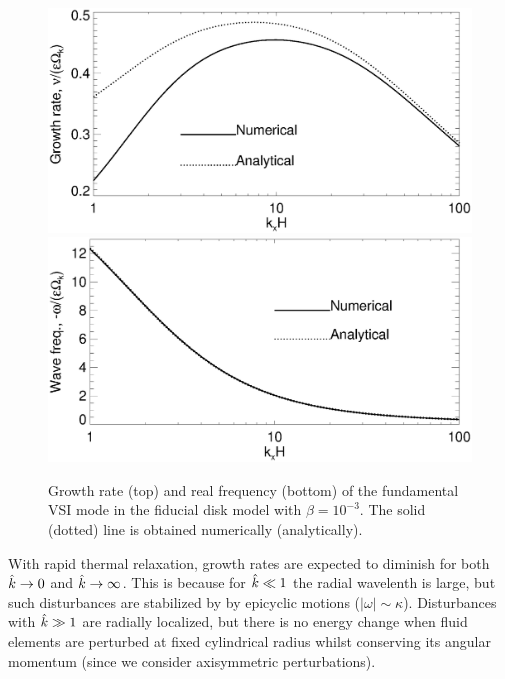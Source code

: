 \begin{figure}
  \includegraphics[width=\linewidth,clip=true,trim=0cm 1.75cm 0cm
  0cm]{figures/compare_eigen_imag_iso} 
  \includegraphics[width=\linewidth,clip=true,trim=0cm 0cm 0cm
  1cm]{figures/compare_eigen_real_iso}
  \caption{Growth rate (top) and real frequency (bottom) of the
    fundamental VSI mode in the fiducial disk model with $\beta =
    10^{-3}$. 
    The solid (dotted) line is obtained numerically
    (analytically).  
    \label{iso_eigen_kx} 
  }
\end{figure}

With rapid thermal relaxation, growth rates are expected to diminish for both $\hat{k}\to 0$
and $\hat{k}\to \infty$. This is because for $\hat{k}\ll 1$ the radial
wavelenth is large, but such disturbances are 
stabilized by by epicyclic motions ($|\omega|\sim
\kappa$). Disturbances with $\hat{k}\gg 1$ are radially localized, but  
there is no energy change when fluid elements are perturbed at fixed
cylindrical radius whilst conserving its angular momentum (since we
consider axisymmetric perturbations).  
 
